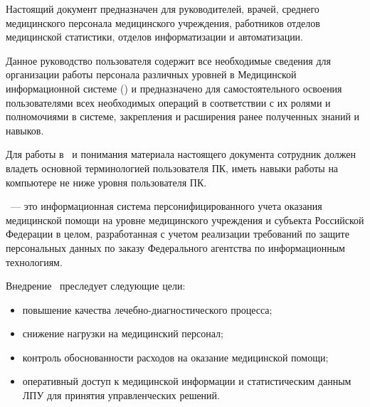 \newpage
{}

 Настоящий документ предназначен для руководителей, врачей, среднего медицинского персонала медицинского учреждения, работников отделов медицинской статистики, отделов информатизации и автоматизации. 
 
 Данное руководство пользователя содержит все необходимые сведения для организации работы персонала различных уровней в Медицинской информационной системе (\tmis) и предназначено для самостоятельного освоения пользователями всех необходимых операций в соответствии с их ролями и полномочиями в системе, закрепления и расширения ранее полученных знаний и навыков.

 Для работы в \tmis~и понимания материала настоящего документа сотрудник должен владеть основной терминологией пользователя ПК, иметь навыки работы на компьютере не ниже уровня пользователя ПК.

 \tmis~--- это информационная система персонифицированного учета оказания медицинской помощи на уровне медицинского учреждения и субъекта Российской Федерации в целом, разработанная с учетом реализации требований по защите персональных данных по заказу Федерального агентства по информационным технологиям.

 Внедрение \tmis~преследует следующие цели:
\begin{itemize}
 	\item повышение качества лечебно-диагностического процесса;
 	\item снижение нагрузки на медицинский персонал;
 	\item контроль обоснованности расходов на оказание медицинской помощи;
 	\item оперативный доступ к медицинской информации и статистическим данным ЛПУ для принятия управленческих решений.
\end{itemize}


